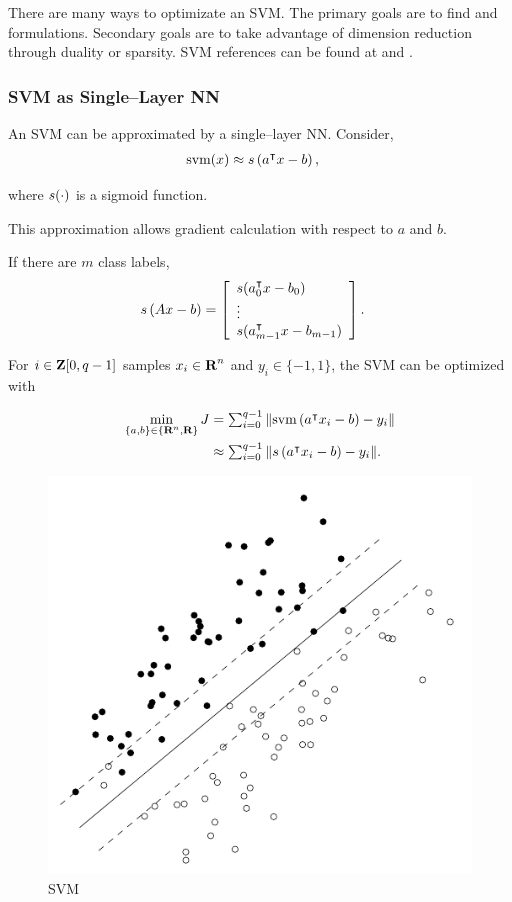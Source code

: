 \documentclass{article}
\begin{document}
    There are many ways to optimizate an SVM.  
    The primary goals are to find \LP and \QP formulations.
    Secondary goals are to take advantage of dimension reduction through duality or sparsity.
    SVM references can be found at \cite{svm1} and \cite{svm2}.
    
    \subsubsection{SVM as Single--Layer NN}
    An SVM can be approximated by a single--layer NN.  Consider,
    \begin{align*}
        \text{svm} (x)&\approx s\left(a^\intercal x - b\right),
    \end{align*}

    where $s(\cdot)$ is a sigmoid function.

    This approximation allows gradient calculation 
    with respect to $a$ and $b$.

    If there are $m$ class labels,
    \begin{align*}
        s\left(A x - b\right)&= \left[\begin{array}{lllllllllllllllllll}s(a_0^\intercal x-b_0) \\ 
        \vdots \\ s(a_{m-1}^\intercal x-b_{m-1}) \end{array}\right].
    \end{align*}

    For $i\in\textbf{Z}[0,q-1]$ samples $x_i\in\textbf{R}^n$ and $y_i\in\{-1,1\}$,
    the SVM can be optimized with

    \begin{align*}
        \min_{\{a,b\}\in\{\textbf{R}^n,\textbf{R}\}}J
        &= \textstyle\sum_{i=0}^{q-1} \|\text{svm}\left(a^\intercal x_i - b\right)-y_i\|\\
        &\approx \textstyle\sum_{i=0}^{q-1} \|s\left(a^\intercal x_i - b\right)-y_i\|.
    \end{align*}

    \begin{figure}[h!]
        \centering
        \includegraphics[width=.5\textwidth]{./figs/svm/svm.png}
        \caption{SVM}
        \label{fig:svm}
    \end{figure}
\end{document}
